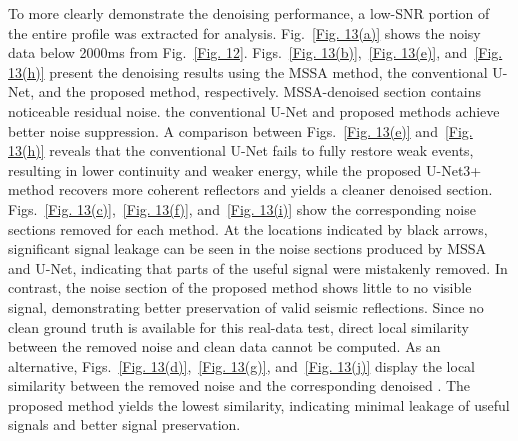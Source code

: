 \documentclass[preprint,12pt,authoryear]{elsarticle}
\begin{document}
To more clearly demonstrate the denoising performance, a low-SNR portion of the entire profile was extracted for analysis. Fig.~\ref{Fig. 13(a)} shows the noisy data below 2000ms from Fig.~\ref{Fig. 12}. Figs.~\ref{Fig. 13(b)},~\ref{Fig. 13(e)}, and~\ref{Fig. 13(h)} present the denoising results using the MSSA method, the conventional U-Net, and the proposed method, respectively.   MSSA-denoised section contains noticeable residual noise.  the conventional U-Net and proposed  methods achieve better noise suppression. A comparison between Figs.~\ref{Fig. 13(e)} and~\ref{Fig. 13(h)} reveals that the conventional U-Net fails to fully restore weak events, resulting in lower continuity and weaker energy, while the proposed U-Net3+ method recovers more coherent reflectors and yields a cleaner denoised section. Figs.~\ref{Fig. 13(c)},~\ref{Fig. 13(f)}, and~\ref{Fig. 13(i)} show the corresponding noise sections removed for each method. At the locations indicated by black arrows, significant signal leakage can be seen in the noise sections produced by MSSA and U-Net, indicating that parts of the useful signal were mistakenly removed. In contrast, the noise section of the proposed method shows little to no visible signal, demonstrating better preservation of valid seismic reflections. Since no clean ground truth is available for this real-data test, direct local similarity between the removed noise and clean data cannot be computed. As an alternative, Figs.~\ref{Fig. 13(d)},~\ref{Fig. 13(g)}, and~\ref{Fig. 13(j)} display the local similarity between the removed noise and the corresponding denoised . The proposed method yields the lowest similarity, indicating minimal leakage of useful signals and better signal preservation.
\end{document}
